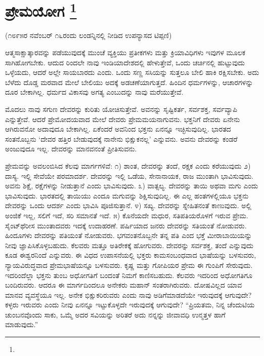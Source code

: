 
\chapter[ಪ್ರೇಮಯೋಗ ]{ಪ್ರೇಮಯೋಗ \protect\footnote{}}

\centerline{(೧೮೯೫ರ ನವೆಂಬರ್​ ೧೬ರಂದು ಲಂಡನ್ನಿನಲ್ಲಿ ನೀಡಿದ ಉಪನ್ಯಾಸದ ಟಿಪ್ಪಣಿ)}

ಆತ್ಮಸಾಕ್ಷಾತ್ಕಾರವನ್ನು ಪಡೆಯುವುದಕ್ಕೆ ಮುಂಚೆ ವ್ಯಕ್ತಿಯು ಪ್ರತೀಕಗಳು ಮತ್ತು ಕ್ರಿಯಾವಿಧಿಗಳು ಇವುಗಳ ಮೂಲಕ ಸಾಗಿಹೋಗಬೇಕು. ಆದುದ ರಿಂದಲೇ ನಾವು ಇಂಡಿಯಾದೇಶದಲ್ಲಿ ಹೇಳುತ್ತೇವೆ, ಒಂದು ಚರ್ಚಿನಲ್ಲಿ ಹುಟ್ಟುವುದು ಒಳ್ಳೆಯದು, ಆದರೆ ಅಲ್ಲೇ ಸಾಯಬಾರದು ಎಂದು. ಒಂದು ಸಣ್ಣ ಸಸಿಯನ್ನು ಸುತ್ತಲೂ ಬೇಲಿ ಹಾಕಿ ರಕ್ಷಿಸಬೇಕು. ಅದು ಬೆಳೆದು ದೊಡ್ಡ ಮರವಾದ ಮೇಲೆ ಬೇಲಿಯು ಅದಕ್ಕೆ ಅಡಚಣೆಯಾಗುತ್ತದೆ. ಹಿಂದಿನ ಧರ್ಮಗಳನ್ನು, ಆಚಾರಗಳನ್ನು ದೂರ ಬೇಕಾಗಿಲ್ಲ. ಧರ್ಮದ ವಿಕಾಸವು ಅಗತ್ಯ ಎಂಬುದನ್ನು ನಾವು ಮರೆಯುತ್ತೇವೆ.

ಮೊದಲು ನಾವು ಸಗುಣ ದೇವರನ್ನು ಕುರಿತು ಯೋಚಿಸುತ್ತೇವೆ. ಅವನನ್ನು ಸೃಷ್ಟಿಕರ್ತ, ಸರ್ವಶಕ್ತ, ಸರ್ವವ್ಯಾಪಿ ಎನ್ನುತ್ತೇವೆ. ಆದರೆ ಪ್ರೇಮೋದಯವಾದ ಮೇಲೆ ದೇವರು ಪ್ರೇಮಮಯನಾಗುವನು. ಭಕ್ತನಿಗೆ ದೇವರು ಏನೇನು ಆಗಿರುವನೋ ಅದಾವುದೂ ಬೇಕಾಗಿಲ್ಲ. ಏಕೆಂದರೆ ಅವನಿಂದ ಭಕ್ತನು ಏನನ್ನೂ ಇಚ್ಛಿಸುವುದಿಲ್ಲ. ಭಾರತದ ಸಂತನೊಬ್ಬನು ‘ದೇವರ ಹತ್ತಿರ ಬೇಡುವುದಕ್ಕೆ ನಾನೇನು ಭಿಕ್ಷುಕನಲ್ಲ’ ಎನ್ನುವನು. ಅವನು ದೇವರನ್ನು ಕಂಡರೆ ಅಂಜುವುದೂ ಇಲ್ಲ. ದೇವರನ್ನು ಮಾನವನಂತೆ ಪ್ರೀತಿಸುವನು.

ಪ್ರೇಮವನ್ನು ಅವಲಂಬಿಸಿದ ಕೆಲವು ಮಾರ್ಗಗಳಿವೆ: ೧) ಶಾಂತ, ದೇವರನ್ನು ತಂದೆ, ರಕ್ಷಕ ಎಂದು ಕರೆಯುವುದು ೨) ದಾಸ್ಯ. ಇಲ್ಲಿ ಸೇವೆಯೇ ಪರಮಾದರ್ಶ. ದೇವರನ್ನು ಇಲ್ಲಿ ಒಡೆಯ, ಸೇನಾನಾಯಕ, ರಾಜ ಮುಂತಾಗಿ ಭಾವಿಸುವುದು. ಅವನು ಶಿಕ್ಷೆ, ರಕ್ಷೆಗಳನ್ನು ನೀಡುತ್ತಾನೆ ಎಂದು ಭಾವಿಸುವುದು. ೩) ವಾತ್ಸಲ್ಯ. ದೇವರನ್ನು ತಾಯಿ ಅಥವಾ ಮಗು ಎಂದು ಭಾವಿಸುವುದು. ಭಾರತದಲ್ಲಿ ತಾಯಿಯು ಎಂದೂ ಮಗುವನ್ನು ಶಿಕ್ಷಿಸುವುದಿಲ್ಲ. ಈ ಎಲ್ಲ ಹಂತಗಳಲ್ಲಿಯೂ ಭಕ್ತನು ದೇವರನ್ನು ಒಂದು ಆದರ್ಶ ಎಂದು ಭಾವಿಸಿ ಪೂಜಿಸುತ್ತಾನೆ. ೪) ಸಖ್ಯ. ದೇವರನ್ನು ಸ್ನೇಹಿತನಂತೆ ಕಾಣುವುದು. ಅಲ್ಲಿ ಅಂಜಿಕೆ ಇಲ್ಲ, ಸಲಿಗೆ ಇದೆ, ಸರಿ ಸಮಾನತೆ ಇದೆ. ೫) ಕೊನೆಯದೇ ಮಧುರ, ಸತಿಪತಿಯರೊಳಗೆ ಇರುವ ಪ್ರೇಮ. ಸೈಂಟ್​ಥೆರೀಸ ಮುಂತಾದವರು ಇದಕ್ಕೆ ಉದಾಹರಣೆ. ಪರ್ಷಿಯಾದ ಜನರು ದೇವರನ್ನು ಸತಿಯಂತೆ ನೋಡುವರು. ಹಿಂದೂಗಳು ದೇವರನ್ನು ಪತಿಯಂತೆ ನೋಡುವರು. ಭಗವಂತನೊಬ್ಬನೇ ತನ್ನ ಪತಿ ಎಂದ ಭಕ್ತೆ ಮೀರಾಬಾಯಿಯನ್ನು ನೀವು ಜ್ಞಾಪಿಸಿಕೊಳ್ಳಬಹುದು. ಕೆಲವರು ಮತ್ತೂ ಅತಿರೇಕಕ್ಕೆ ಹೋಗುವರು. ದೇವರನ್ನು ಸರ್ವಶಕ್ತ, ತಂದೆ ಎನ್ನುವುದು ಕೂಡ ಈಶ್ವರನಿಂದೆ ಎನ್ನುವರು. ಈ ವಿಧದ ಉಪಾಸನೆಯಲ್ಲಿ ಭಕ್ತರು ಕಾಮಸಂಬಂಧವಾದ ಭಾಷೆಯನ್ನು ಬಳಸುವರು, ನ್ಯಾಯವಿರುದ್ಧವಾದ ಪ್ರೇಮಭಾಷೆಯನ್ನೂ ಬಳಸುವರು. ಕೃಷ್ಣ ಮತ್ತು ಗೋಪಿಯರ ಪ್ರೇಮ ಈ ಗುಂಪಿಗೆ ಸೇರುವುದು. ಇದರಿಂದೆಲ್ಲಾ ಭಕ್ತನು ತುಂಬ ಅಧೋಗತಿಗೆ ಬಂದಂತೆ ನಿಮಗೆ ಕಾಣಿಸಬಹುದು. ಕೆಲವರು ಇದರಿಂದ ಅಧೋಗತಿಗೂ ಬಂದಿರುವರು. ಆದರೂ ಈ ಮಾರ್ಗದಿಂದಲೂ ಅನೇಕರು ಮಹಾನ್​ ಸಂತರಾಗಿರುವರು. ದೋಷವಿಲ್ಲದ ಯಾವ ಮಾನವ ವ್ಯವಸ್ಥೆಯೂ ಇಲ್ಲ. ಅನೇಕ ಭಿಕ್ಷುಕರಿರುವರು ಎಂದು ನಾವು ಅಡಿಗೆಮಾಡದೆಯೇ ಇರುವುದಕ್ಕೆ ಆಗುವುದೇ? ಕಳ್ಳರು ಇರುವರು ಎಂದು ನೀವು ಏನನ್ನೂ ಇಟ್ಟುಕೊಳ್ಳದೇ ಇರುವುದಕ್ಕೆ ಆಗುವುದೇ? “ಪ್ರಿಯತಮ, ನಿನ್ನ ಚೆಂದುಟಿಯ ಚುಂಬನವೊಂದು ಸಾಕು, ಒಮ್ಮೆ ಅದರ ಸವಿಯನ್ನು ಅರಿತರೆ ಅದು ನನ್ನನ್ನು ಜೀವಾವಧಿ ಉನ್ಮತ್ತಳ ಹಾಗೆ ಮಾಡುವುದು.”

